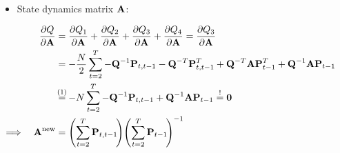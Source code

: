 		\begin{itemize}
			\item State dynamics matrix \(\boldsymbol{\mathrm{A}}\):
		\end{itemize}
		\begin{align}
			&&\pdv{Q}{\mat{A}}
				&= \pdv{Q_1}{\mat{A}} + \pdv{Q_2}{\mat{A}} + \pdv{Q_3}{\mat{A}} + \pdv{Q_4}{\mat{A}} = \pdv{Q_3}{\mat{A}} & \nonumber \\
			&&	&= -\frac{N}{2} \sum_{t = 2}^{T} -\mat{Q}^{-1} \mat{P}_{t, t - 1} - \mat{Q}^{-T} \mat{P}_{t, t - 1}^T + \mat{Q}^{-T} \mat{A} \mat{P}_{t - 1}^T + \mat{Q}^{-1} \mat{A} \mat{P}_{t - 1} & \nonumber \\
			&&	&\oversetfootnotemark{=} -N \sum_{t = 2}^{T} -\mat{Q}^{-1} \mat{P}_{t, t - 1} + \mat{Q}^{-1} \mat{A} \mat{P}_{t - 1} \overset{!}{=} \mat{0} & \nonumber \\
			\implies && \mat{A}^\new &= \Bigg(\! \sum_{t = 2}^{T} \mat{P}_{t, t - 1} \!\Bigg) \Bigg(\! \sum_{t = 2}^{T} \mat{P}_{t - 1} \!\Bigg)^{-1} & \label{eq:stateDynamicsMatrix}
		\end{align}
		\pagebreak

